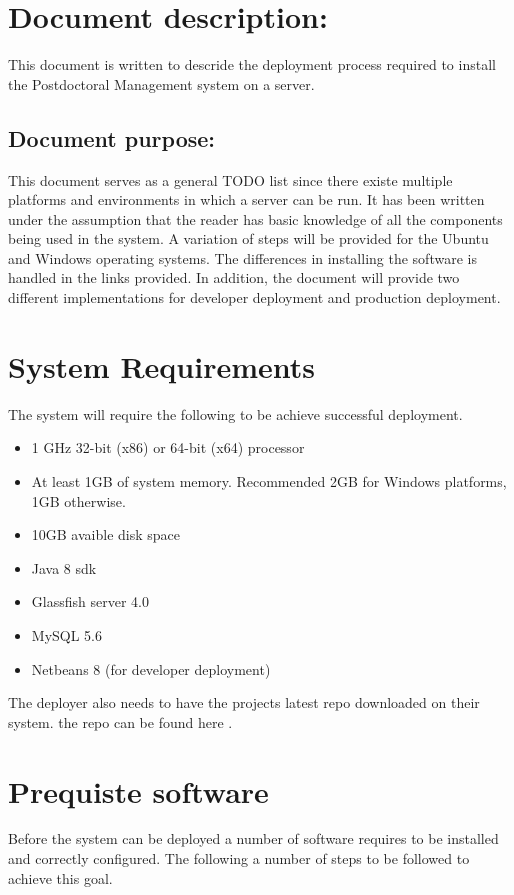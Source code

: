 \documentclass[12pt]{article}
\begin{document}
\listoffigures
\newpage
\section{Document description:}
This document is written to descride the deployment process required to install the Postdoctoral Management system on a server.
\subsection{Document purpose:}
\vspace{0.2in}
This document serves as a general TODO list since there existe multiple platforms and environments in which a server can be run. It has been written under the assumption that the reader has basic knowledge of all the components being used in the system. A variation of steps will be provided for the Ubuntu and Windows operating systems. The differences in installing the software is handled in the links provided. In addition, the document will provide two different implementations for developer deployment and production deployment. 

\vspace{0.2in}

\section{System Requirements}
The system will require the following to be achieve successful deployment.
\begin{itemize}
\item 1 GHz 32-bit (x86) or 64-bit (x64) processor
\item At least 1GB of system memory. Recommended 2GB for Windows platforms, 1GB otherwise.
\item 10GB avaible disk space
\item Java 8 sdk
\item Glassfish server 4.0
\item MySQL 5.6
\item Netbeans 8 (for developer deployment)
\end{itemize}
The deployer also needs to have the projects latest repo downloaded on their system. the repo can be found here \textbf{}.

\section{Prequiste software}
Before the system can be deployed a number of software requires to be installed and correctly configured. The following a number of steps to be followed to achieve this goal.
\end{document}
